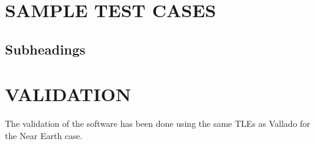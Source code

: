 \documentclass{article}
\begin{document}




\section{SAMPLE TEST CASES}
\label{sec:sampletestcases}


\subsection{Subheadings}
\label{ssec:subhead}



\section{VALIDATION}
\label{sec:validation}

The validation of the software has been done using the same TLEs as Vallado for the Near Earth case.
\end{document}
